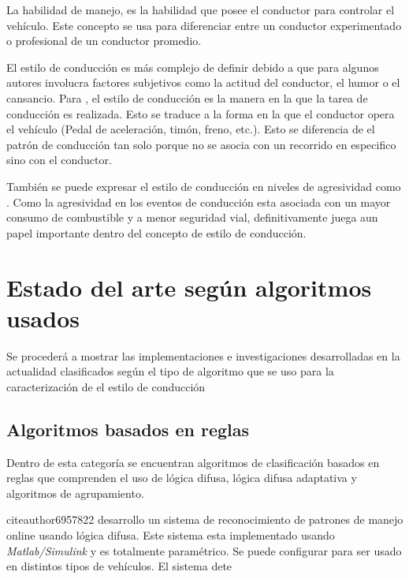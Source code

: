 La habilidad de manejo, es la habilidad que posee el conductor para controlar el vehículo. Este concepto se usa para diferenciar entre un conductor experimentado o profesional de un conductor promedio.

El estilo de conducción es más complejo de definir debido a que para algunos autores involucra factores subjetivos como la actitud del conductor, el humor o el cansancio. Para \citeauthor{6957822} \cite{6957822}, el estilo de conducción  es la manera en la que la tarea de conducción es realizada. Esto se traduce a la forma en la que el conductor opera el vehículo (Pedal de aceleración, timón, freno, etc.). Esto se diferencia de el patrón de conducción tan solo porque no se asocia con un recorrido en especifico sino con el conductor.

También se puede expresar el estilo de conducción en niveles de agresividad como \citeauthor{6294318} \cite{6294318}. Como la agresividad en los eventos de conducción esta asociada con un mayor consumo de combustible y a menor seguridad vial, definitivamente juega aun papel importante dentro del concepto de estilo de conducción. 

\section{Estado del arte según algoritmos usados}
Se procederá a mostrar las implementaciones e investigaciones desarrolladas en la actualidad clasificados según el tipo de algoritmo que se uso para la caracterización de el estilo de conducción

\subsection{Algoritmos basados en reglas}
Dentro de esta categoría se encuentran algoritmos de clasificación basados en reglas que comprenden el uso de lógica difusa, lógica difusa adaptativa y algoritmos de agrupamiento.

citeauthor{6957822} \cite{6957822} desarrollo un sistema de reconocimiento de patrones de manejo online usando lógica difusa. Este sistema esta implementado usando {\it Matlab/Simulink}  y es totalmente paramétrico. Se puede configurar para ser usado en distintos tipos de vehículos.
El sistema dete


